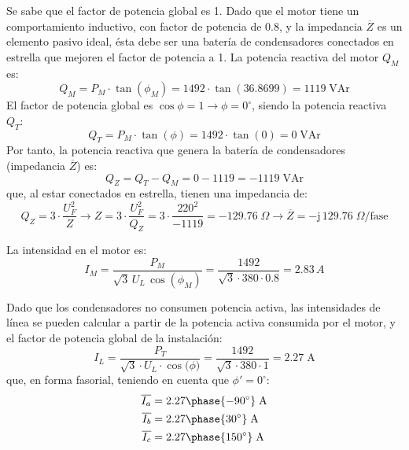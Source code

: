 Se sabe que el factor de potencia global es 1. Dado que el motor tiene
un comportamiento inductivo, con factor de potencia de $0.8$, y la
impedancia $\overline{Z}$ es un elemento pasivo ideal, {ésta debe ser
  una batería de condensadores} conectados en estrella que mejoren el
factor de potencia a 1. La potencia reactiva del motor $Q_M$ es:
\begin{equation*}
  Q_M=P_M\cdot \tan(\phi_M)=1492\cdot \tan(36.8699)=1119\;\text{VAr}
\end{equation*}
El factor de potencia global es $\cos{\phi}=1\rightarrow\phi=0^\circ$,
siendo la potencia reactiva $Q_T$:
\begin{equation*}
  Q_T=P_M\cdot \tan(\phi)=1492\cdot \tan(0)=0\;\text{VAr}
\end{equation*}
Por tanto, la potencia reactiva que genera la batería de condensadores
(impedancia $\overline{Z}$) es:
\begin{equation*}
  Q_Z=Q_T-Q_M=0-1119=-1119\;\text{VAr}
\end{equation*}
que, al estar conectados en estrella, tienen una impedancia de:
\begin{equation*}
  Q_Z=3\cdot \dfrac{U_F^2}{Z}\rightarrow Z=3\cdot \dfrac{U_F^2}{Q_Z}=3\cdot \dfrac{220^2}{-1119}=-129.76\;\Omega\rightarrow \overline{Z}={-\mathrm{j}\,129.76}\;\Omega\text{/fase}
\end{equation*}

La intensidad en el motor es:
\begin{equation*}
  I_M=\dfrac{P_M}{\sqrt{3}\,U_L\,\cos(\phi_M)}=\dfrac{1492}{\sqrt{3}\cdot 380\cdot 0.8}=2.83\,A
\end{equation*}

Dado que los condensadores no consumen potencia activa, las
intensidades de línea se pueden calcular a partir de la potencia
activa consumida por el motor, y el factor de potencia global de la
instalación:
\begin{equation*}
  I_L=\dfrac{P_T}{\sqrt{3}\cdot U_L\cdot \cos{(\phi})}=\dfrac{1492}{\sqrt{3}\cdot 380\cdot 1}=2.27\;\text{A}
\end{equation*}
que, en forma fasorial, teniendo en cuenta que $\phi'=0^\circ$:
\begin{align*}
  \overline{I_{a}}&={2.27\phase{-90^\circ}\;\text{A}}\\
  \overline{I_{b}}&={2.27\phase{30^\circ}\;\text{A}}\\
  \overline{I_{c}}&={2.27\phase{150^\circ}\;\text{A}}
\end{align*}

